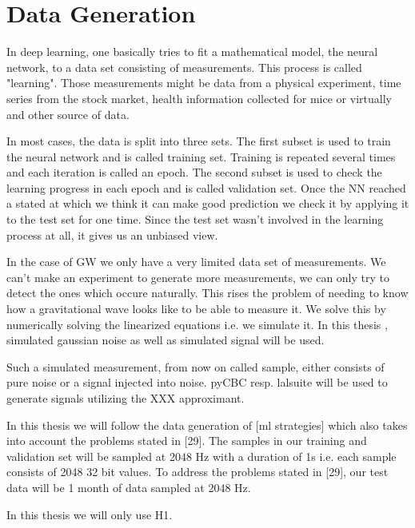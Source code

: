 
\section{Data Generation}
In deep learning, one basically tries to fit a mathematical model, the neural
network, to a data set consisting of measurements. This process is called
"learning".
Those measurements might be data from a physical experiment, time series from
the stock market, health information collected for mice or virtually and
other source of data.

In most cases, the data is split into three sets. The first subset is used to
train the neural network and is called training set. Training is repeated several
times and each iteration is called an epoch. The second subset is used to check
the learning progress in each epoch and is called validation set. Once the NN
reached a stated at which we think it can make good prediction we check it by
applying it to the test set for one time. Since the test set wasn't involved in
the learning process at all, it gives us an unbiased view.

In the case of GW we only have a very limited data set of measurements. We can't
make an experiment to generate more measurements, we can only try to detect the
ones which occure naturally. This rises the problem of needing to know how a
gravitational wave looks like to be able to measure it. We solve this by
numerically solving the linearized equations i.e. we simulate it. In this thesis
, simulated gaussian noise as well as simulated signal will be used.

Such a simulated measurement, from now on called sample, either consists of pure
noise or a signal injected into noise. pyCBC resp. lalsuite will be used to 
generate signals utilizing the XXX approximant. 

In this thesis we will follow the data generation of [ml strategies] which also
takes into account the problems stated in [29]. The samples in our training and
validation set will be sampled at 2048 Hz with a duration of 1s i.e. each sample
consists of 2048 32 bit values. To address the problems stated in [29], our test
data will be 1 month of data sampled at 2048 Hz.

In this thesis we will only use H1.

